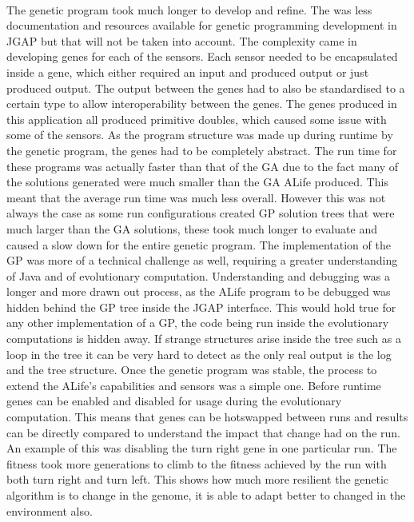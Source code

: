 \documentclass[12pt]{article}
\begin{document}
\paragraph{}
The genetic program took much longer to develop and refine. The was less documentation and resources available for genetic programming 
development in JGAP but that will not be taken into account. The complexity came in developing genes for each of the sensors. Each sensor
needed to be encapsulated inside a gene, which either required an input and produced output or just produced output. The output between
the genes had to also be standardised to a certain type to allow interoperability between the genes. The genes produced in this application
all produced primitive doubles, which caused some issue with some of the sensors. As the program structure was made up during runtime by
the genetic program, the genes had to be completely abstract. The run time for these programs was actually faster than that of the GA due
to the fact many of the solutions generated were much smaller than the GA ALife produced. This meant that the average run time was much 
less overall. However this was not always the case as some run configurations created GP solution trees that were much larger than the 
GA solutions, these took much longer to evaluate and caused a slow down for the entire genetic program. The implementation of the GP was 
more of a technical challenge as well, requiring a greater understanding of Java and of evolutionary computation. Understanding and debugging
was a longer and more drawn out process, as the ALife program to be debugged was hidden behind the GP tree inside the JGAP interface.
This would hold true for any other implementation of a GP, the code being run inside the evolutionary computations is hidden away. If strange
structures arise inside the tree such as a loop in the tree it can be very hard to detect as the only real output is the log and
the tree structure. Once the genetic program was stable, the process to extend the ALife's capabilities and sensors was a simple one. Before
runtime genes can be enabled and disabled for usage during the evolutionary computation. This means that genes can be hotswapped between
runs and results can be directly compared to understand the impact that change had on the run. An example of this was disabling the turn
right gene in one particular run. The fitness took more generations to climb to the fitness achieved by the run with both turn right and
turn left. This shows how much more resilient the genetic algorithm is to change in the genome, it is able to adapt better to changed in
the environment also.
\end{document}
